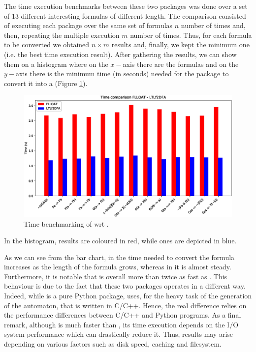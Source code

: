 The time execution benchmarks between these two packages was done over a set of $13$ different interesting \LTLf formulas of different length.
The comparison consisted of executing each package over the same set of formulas $n$ number of times and, then, repeating the multiple execution $m$ number of times. Thus, for each formula to be converted we obtained $n \times m$ results and, finally, we kept the minimum one (i.e. the best time execution result).
After gathering the results, we can show them on a histogram where on the $x-$axis there are the \LTLf formulas and on the $y-$axis there is the minimum time (in seconds) needed for the package to convert it into a \DFA (Figure \ref{fig:time-comparison}).
\begin{figure}[h]
\centering
\includegraphics[width=\linewidth]{images/new-time-comp.eps}
\caption{Time benchmarking of \LTLfToDFA wrt \FLLOAT.} 
\label{fig:time-comparison}
\end{figure}
In the histogram, \FLLOAT results are coloured in red, while \LTLfToDFA ones are depicted in blue.


 As we can see from the bar chart, in \FLLOAT the time needed to convert the formula increases as the length of the formula grows, whereas in \LTLfToDFA it is almost steady. Furthermore, it is notable that \LTLfToDFA is overall more than twice as fast as \FLLOAT.
This behaviour is due to the fact that these two packages operates in a different way. Indeed, while \FLLOAT is a pure Python package, \LTLfToDFA uses, for the heavy task of the generation of the automaton, \MONA that is written in C/C++. Hence, the real difference relies on the performance differences between C/C++ and Python programs.
As a final remark, although \LTLfToDFA is much faster than \FLLOAT, its time execution depends on the I/O system performance which can drastically reduce it. Thus, \LTLfToDFA results may arise depending on various factors such as disk speed, caching and filesystem.
